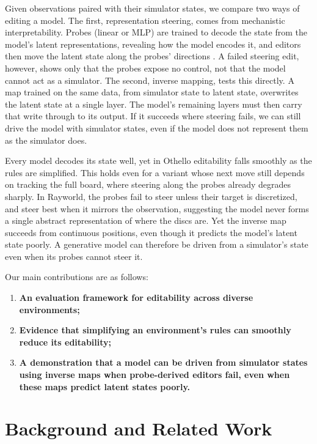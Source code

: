 \documentclass{article} %
\begin{document}
Given observations paired with their simulator states, we compare two ways of editing a model. The first, representation steering, comes from mechanistic interpretability. Probes (linear or MLP) are trained to decode the state from the model's latent representations, revealing how the model encodes it, and editors then move the latent state along the probes' directions \citep{li2023othello,nanda2023linear}. A failed steering edit, however, shows only that the probes expose no control, not that the model cannot act as a simulator. The second, inverse mapping, tests this directly. A map trained on the same data, from simulator state to latent state, overwrites the latent state at a single layer. The model's remaining layers must then carry that write through to its output. If it succeeds where steering fails, we can still drive the model with simulator states, even if the model does not represent them as the simulator does.

Every model decodes its state well, yet in Othello editability falls smoothly as the rules are simplified. This holds even for a variant whose next move still depends on tracking the full board, where steering along the probes already degrades sharply. In Rayworld, the probes fail to steer unless their target is discretized, and steer best when it mirrors the observation, suggesting the model never forms a single abstract representation of where the discs are. Yet the inverse map succeeds from continuous positions, even though it predicts the model's latent state poorly. A generative model can therefore be driven from a simulator's state even when its probes cannot steer it.

Our main contributions are as follows:
\begin{enumerate}[
label=(\arabic*),
leftmargin=*,
align=left,
itemsep=0.25em,
topsep=0pt,
parsep=0pt,
partopsep=0pt
]
\item \textbf{An evaluation framework for editability across diverse environments;}
\item \textbf{Evidence that simplifying an environment's rules can smoothly reduce its editability;}
\item \textbf{A demonstration that a model can be driven from simulator states using inverse maps when probe-derived editors fail, even when these maps predict latent states poorly.}
\end{enumerate}



\section{Background and Related Work}
\end{document}

